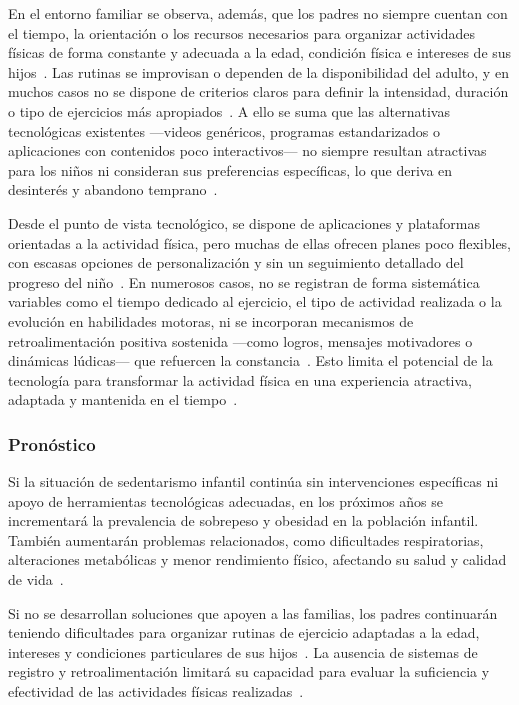 					En el entorno familiar se observa, además, que los padres no siempre cuentan con el tiempo, la orientación o los recursos necesarios para organizar actividades físicas de forma constante y adecuada a la edad, condición física e intereses de sus hijos~\cite{VegaDiaz2023}. Las rutinas se improvisan o dependen de la disponibilidad del adulto, y en muchos casos no se dispone de criterios claros para definir la intensidad, duración o tipo de ejercicios más apropiados~\cite{Hesketh2017}. A ello se suma que las alternativas tecnológicas existentes ---videos genéricos, programas estandarizados o aplicaciones con contenidos poco interactivos--- no siempre resultan atractivas para los niños ni consideran sus preferencias específicas, lo que deriva en desinterés y abandono temprano~\cite{Zhu2024}.
					
					Desde el punto de vista tecnológico, se dispone de aplicaciones y plataformas orientadas a la actividad física, pero muchas de ellas ofrecen planes poco flexibles, con escasas opciones de personalización y sin un seguimiento detallado del progreso del niño~\cite{Direito2017}. En numerosos casos, no se registran de forma sistemática variables como el tiempo dedicado al ejercicio, el tipo de actividad realizada o la evolución en habilidades motoras, ni se incorporan mecanismos de retroalimentación positiva sostenida ---como logros, mensajes motivadores o dinámicas lúdicas--- que refuercen la constancia~\cite{Xu2022}. Esto limita el potencial de la tecnología para transformar la actividad física en una experiencia atractiva, adaptada y mantenida en el tiempo~\cite{Zhu2024}.
					
				\subsubsection{Pronóstico}
					Si la situación de sedentarismo infantil continúa sin intervenciones específicas ni apoyo de herramientas tecnológicas adecuadas, en los próximos años se incrementará la prevalencia de sobrepeso y obesidad en la población infantil. También aumentarán problemas relacionados, como dificultades respiratorias, alteraciones metabólicas y menor rendimiento físico, afectando su salud y calidad de vida~\cite{Wilhite2023}.
					
					Si no se desarrollan soluciones que apoyen a las familias, los padres continuarán teniendo dificultades para organizar rutinas de ejercicio adaptadas a la edad, intereses y condiciones particulares de sus hijos~\cite{Yao2015}. La ausencia de sistemas de registro y retroalimentación limitará su capacidad para evaluar la suficiencia y efectividad de las actividades físicas realizadas~\cite{Direito2017}.
					
